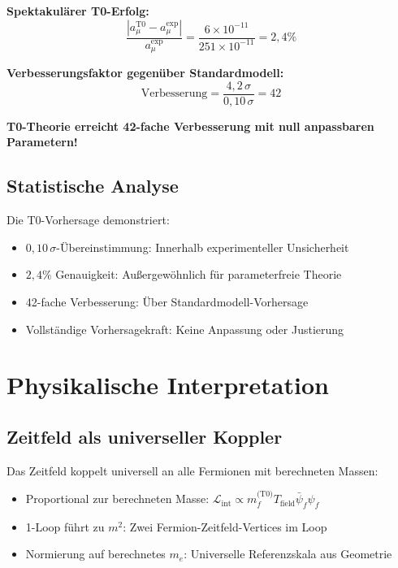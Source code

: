 \documentclass[12pt,a4paper]{article}
\numberwithin{equation}{section}
\begin{document}
	\begin{t0erfolg}
		\textbf{Spektakul\"arer T0-Erfolg:}
		\begin{equation}
			\frac{|a_\mu^{\text{T0}} - a_\mu^{\text{exp}}|}{a_\mu^{\text{exp}}} = \frac{6 \times 10^{-11}}{251 \times 10^{-11}} = 2{,}4\%
		\end{equation}
		
		\textbf{Verbesserungsfaktor gegen\"uber Standardmodell:}
		\begin{equation}
			\text{Verbesserung} = \frac{4{,}2\,\sigma}{0{,}10\,\sigma} = 42
		\end{equation}
		
		\textbf{T0-Theorie erreicht 42-fache Verbesserung mit null anpassbaren Parametern!}
	\end{t0erfolg}
	
	\subsection{Statistische Analyse}
	
	Die T0-Vorhersage demonstriert:
	\begin{itemize}
		\item $0{,}10\,\sigma$-\"Ubereinstimmung: Innerhalb experimenteller Unsicherheit
		\item $2{,}4\%$ Genauigkeit: Au\ss{}ergew\"ohnlich f\"ur parameterfreie Theorie
		\item 42-fache Verbesserung: \"Uber Standardmodell-Vorhersage
		\item Vollst\"andige Vorhersagekraft: Keine Anpassung oder Justierung
	\end{itemize}
	
	\section{Physikalische Interpretation}
	
	\subsection{Zeitfeld als universeller Koppler}
	
	Das Zeitfeld koppelt universell an alle Fermionen mit berechneten Massen:
	\begin{itemize}
		\item Proportional zur berechneten Masse: $\mathcal{L}_{\text{int}} \propto m_f^{\text{(T0)}} T_{\text{field}} \bar{\psi}_f \psi_f$
		\item 1-Loop f\"uhrt zu $m^2$: Zwei Fermion-Zeitfeld-Vertices im Loop
		\item Normierung auf berechnetes $m_e$: Universelle Referenzskala aus Geometrie
	\end{itemize}
	
\end{document}
